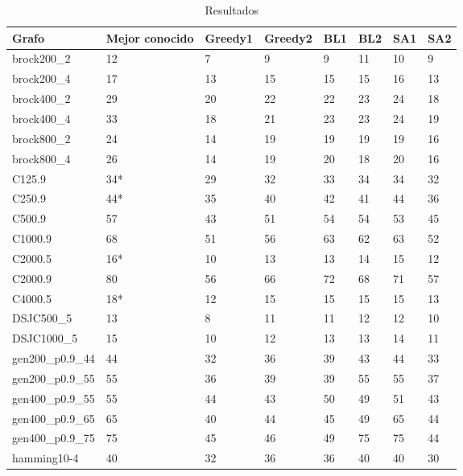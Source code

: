 \iffalse

\begin{table}[H]
\centering
\caption{Resultados}
\begin{tabular}{|l|l|l|l|l|l|l|l|}
\hline
Grafo              & Mejor conocido & Greedy1 & Greedy2 & BL1 & BL2 & SA1 & SA2 \\ \hline
brock200\_2        & 12 & 7 & 9 & 9 & 11 & 10 & 9 \\ \hline
brock200\_4        & 17 & 13 & 15 & 15 & 15 & 16 & 13 \\ \hline
brock400\_2        & 29 & 20 & 22 & 22 & 23 & 24 & 18 \\ \hline
brock400\_4        & 33 & 18 & 21 & 23 & 23 & 24 & 19 \\ \hline
brock800\_2        & 24 & 14 & 19 & 19 & 19 & 19 & 16 \\ \hline
brock800\_4        & 26 & 14 & 19 & 20 & 18 & 20 & 16 \\ \hline
C125.9             & 34* & 29 & 32 & 33 & 34 & 34 & 32 \\ \hline
C250.9             & 44* & 35 & 40 & 42 & 41 & 44 & 36 \\ \hline
C500.9             & 57 & 43 & 51 & 54 & 54 & 53 & 45 \\ \hline
C1000.9            & 68 & 51 & 56 & 63 & 62 & 63 & 52 \\ \hline
C2000.5            & 16* & 10 & 13 & 13 & 14 & 15 & 12 \\ \hline
C2000.9            & 80 & 56 & 66 & 72 & 68 & 71 & 57 \\ \hline
C4000.5            & 18* & 12 & 15 & 15 & 15 & 15 & 13 \\ \hline
DSJC500\_5         & 13 & 8 & 11 & 11 & 12 & 12 & 10 \\ \hline
DSJC1000\_5        & 15 & 10 & 12 & 13 & 13 & 14 & 11 \\ \hline
gen200\_p0.9\_44   & 44 & 32 & 36 & 39 & 43 & 44 & 33 \\ \hline
gen200\_p0.9\_55   & 55 & 36 & 39 & 39 & 55 & 55 & 37 \\ \hline
gen400\_p0.9\_55   & 55 & 44 & 43 & 50 & 49 & 51 & 43 \\ \hline
gen400\_p0.9\_65   & 65 & 40 & 44 & 45 & 49 & 65 & 44 \\ \hline
gen400\_p0.9\_75   & 75 & 45 & 46 & 49 & 75 & 75 & 44 \\ \hline
hamming10-4        & 40 & 32 & 36 & 36 & 40 & 40 & 30 \\ \hline

\end{tabular}
\end{table}
